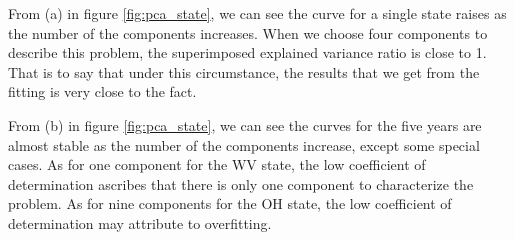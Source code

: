 \documentclass{mcmthesis}
\begin{document}
From (a) in figure \ref{fig:pca_state}, we can see the curve for a single state raises as the number of the components increases. When we choose four components to describe this problem, the superimposed explained variance ratio is close to 1. That is to say that under this circumstance, the results that we get from the fitting is very close to the fact. 

From (b) in figure \ref{fig:pca_state}, we can see the curves for the five years are almost stable as the number of the components increase, except some special cases. As for one component for the WV state, the low coefficient of determination ascribes that there is only one component to characterize the problem. As for nine components for the OH state, the low coefficient of determination may attribute to overfitting. 

~\smallskip
\end{document}
